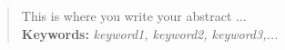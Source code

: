 
\begin{abstract}
This is where you write your abstract ... \newline
\\
\textbf{Keywords: } \textit{keyword1, keyword2, keyword3,...}
\end{abstract}
